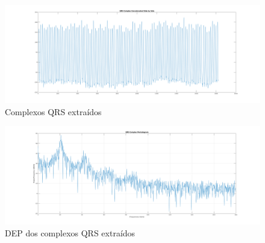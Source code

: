 \documentclass{article}
\begin{document}
\begin{figure}[H]
	\begin{center}
		\includegraphics[scale=0.11]{Figures/qrs_sideside.png}
		\caption{Complexos QRS extraídos}
		\label{fig:2qrs}
	\end{center}
\end{figure}

\begin{figure}[H]
	\begin{center}
		\includegraphics[scale=0.11]{Figures/dep_qrs.png}
		\caption{DEP dos complexos QRS extraídos}
		\label{fig:2dep}
	\end{center}
\end{figure}



\end{document}
